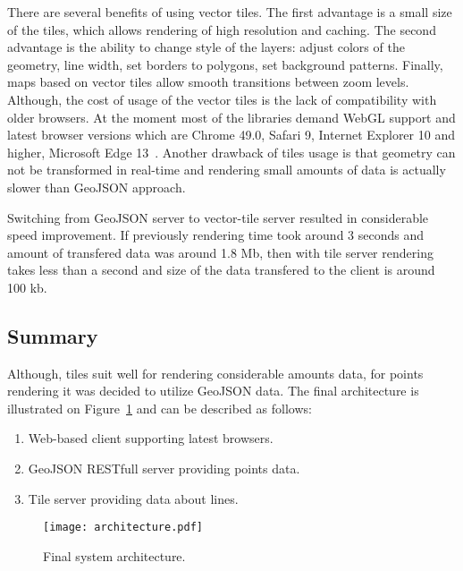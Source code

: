 There are several benefits of using vector tiles. The first advantage is a small size of the tiles,
which allows rendering of high resolution and caching. The second advantage is the ability to change
style of the layers: adjust colors of the geometry, line width, set borders to polygons,
set background patterns. Finally, maps based on vector tiles allow smooth transitions between
zoom levels. Although, the cost of usage of the vector tiles is the lack of
compatibility with older browsers. At the moment most of the libraries demand WebGL support and
latest browser versions which are Chrome 49.0, Safari 9, Internet Explorer 10 and higher,
Microsoft Edge 13~\cite{google:support,mapbox:support}. Another drawback of tiles usage is
that geometry can not be transformed in real-time and rendering small amounts of data is actually
slower than GeoJSON approach.

Switching from GeoJSON server to vector-tile server resulted in considerable speed improvement.
If previously rendering time took around 3 seconds and amount of transfered data was around 1.8 Mb,
then with tile server rendering takes less than a second and size of the data transfered to the
client is around 100 kb.


\subsection{Summary}

Although, tiles suit well for rendering considerable amounts data, for points rendering it was
decided to utilize GeoJSON data. The final architecture is illustrated on
Figure~\ref{pic:architecture} and can be described as follows:

\begin{enumerate}
  \item Web-based client supporting latest browsers.
  \item GeoJSON RESTfull server providing points data.
  \item Tile server providing data about lines.
\end{enumerate}

\begin{figure}[t]
  \centering
  \texttt{[image: architecture.pdf]}
  \caption{Final system architecture.}
  \label{pic:architecture}
\end{figure}
